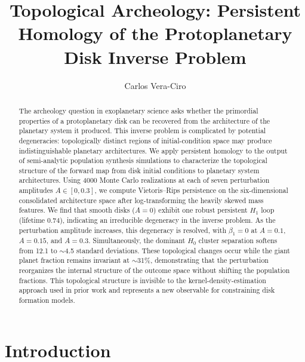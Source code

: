 \documentclass[twocolumn]{aastex631}
\begin{document}
\title{Topological Archeology: Persistent Homology of the Protoplanetary Disk
Inverse Problem}

\author{Carlos Vera-Ciro}

\begin{abstract}
The archeology question in exoplanetary science asks whether the primordial
properties of a protoplanetary disk can be recovered from the architecture of
the planetary system it produced.  This inverse problem is complicated by
potential degeneracies: topologically distinct regions of initial-condition
space may produce indistinguishable planetary architectures.  We apply
persistent homology to the output of semi-analytic population synthesis
simulations to characterize the topological structure of the forward map from
disk initial conditions to planetary system architectures.  Using 4000 Monte
Carlo realizations at each of seven perturbation amplitudes $A \in [0, 0.3]$,
we compute Vietoris--Rips persistence on the six-dimensional consolidated
architecture space after log-transforming the heavily skewed mass features.
We find that smooth disks ($A=0$) exhibit one robust persistent $H_1$ loop
(lifetime 0.74), indicating an irreducible degeneracy in the inverse problem.
As the perturbation amplitude increases, this degeneracy is resolved, with
$\beta_1 = 0$ at $A = 0.1$, $A = 0.15$, and $A = 0.3$.  Simultaneously, the
dominant $H_0$ cluster separation softens from 12.1 to $\sim$4.5 standard
deviations.  These topological changes occur while the giant planet fraction
remains invariant at $\sim$31\%, demonstrating that the perturbation
reorganizes the internal structure of the outcome space without shifting the
population fractions.  This topological structure is invisible to the
kernel-density-estimation approach used in prior work and represents a new
observable for constraining disk formation models.
\end{abstract}


\section{Introduction}
\label{sec:intro}
\end{document}
